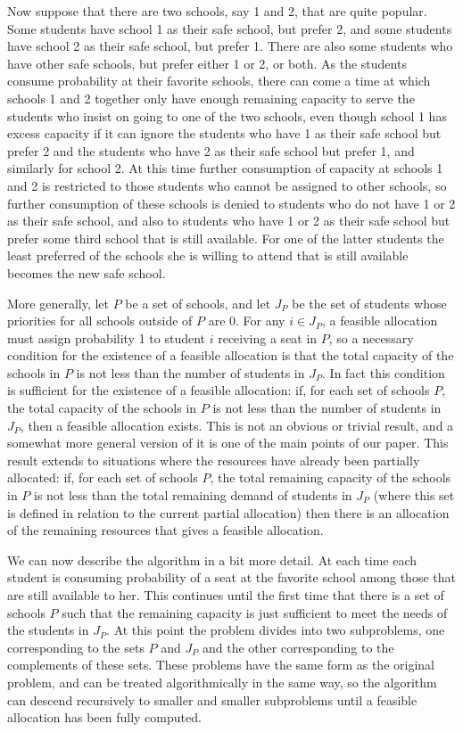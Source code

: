 \documentclass[12pt]{article}
\theoremstyle{definition}
\begin{document}
Now suppose that there are two schools, say 1 and 2, that are quite
popular.  Some students have school 1 as their safe school, but prefer
2, and some students have school 2 as their safe school, but prefer 1.
There are also some students who have other safe schools, but prefer
either 1 or 2, or both.  As the students consume probability at their
favorite schools, there can come a time at which schools 1 and 2
together only have enough remaining capacity to serve the students who
insist on going to one of the two schools, even though school 1 has
excess capacity if it can ignore the students who have 1 as their safe
school but prefer 2 and the students who have 2 as their safe school
but prefer 1, and similarly for school 2.  At this time further
consumption of capacity at schools 1 and 2 is restricted to those
students who cannot be assigned to other schools, so further
consumption of these schools is denied to students who do not have 1
or 2 as their safe school, and also to students who have 1 or 2 as
their safe school but prefer some third school that is still
available.  For one of the latter students the least preferred of the
schools she is willing to attend that is still available becomes the
new safe school.

More generally, let $P$ be a set of schools, and let $J_P$ be the set
of students whose priorities for all schools outside of $P$ are 0.
For any $i \in J_P$, a feasible allocation must assign probability 1
to student $i$ receiving a seat in $P$, so a necessary condition for
the existence of a feasible allocation is that the total capacity of
the schools in $P$ is not less than the number of students in $J_P$.
In fact this condition is sufficient for the existence of a feasible
allocation: if, for each set of schools $P$, the total capacity of the
schools in $P$ is not less than the number of students in $J_P$, then
a feasible allocation exists.  This is not an obvious or trivial
result, and a somewhat more general version of it is one of the main
points of our paper.  This result extends to situations where the
resources have already been partially allocated: if, for each set of
schools $P$, the total remaining capacity of the schools in $P$ is not
less than the total remaining demand of students in $J_P$ (where this
set is defined in relation to the current partial allocation) then
there is an allocation of the remaining resources that gives a
feasible allocation.

We can now describe the algorithm in a bit more detail.  At each time
each student is consuming probability of a seat at the favorite school
among those that are still available to her.  This continues until the
first time that there is a set of schools $P$ such that the remaining
capacity is just sufficient to meet the needs of the students in
$J_P$.  At this point the problem divides into two subproblems, one
corresponding to the sets $P$ and $J_P$ and the other corresponding to
the complements of these sets.  These problems have the same form as
the original problem, and can be treated algorithmically in the same
way, so the algorithm can descend recursively to smaller and smaller
subproblems until a feasible allocation has been fully computed.
\end{document}
